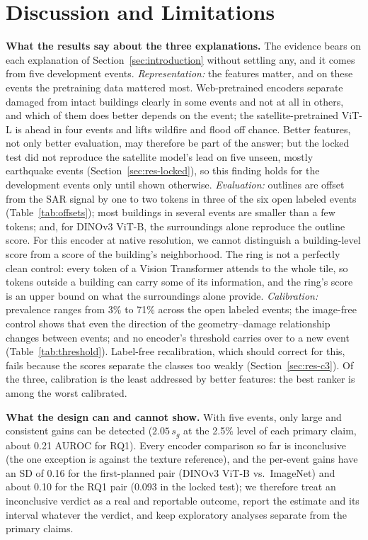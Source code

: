 \documentclass{ieeeaccess}
\begin{document}
\section{Discussion and Limitations}
\label{sec:discussion}

\textbf{What the results say about the three explanations.} The evidence bears on each explanation of Section~\ref{sec:introduction} without settling any, and it comes from five development events. \emph{Representation:} the features matter, and on these events the pretraining data mattered most. Web-pretrained encoders separate damaged from intact buildings clearly in some events and not at all in others, and which of them does better depends on the event; the satellite-pretrained ViT-L is ahead in four events and lifts wildfire and flood off chance. Better features, not only better evaluation, may therefore be part of the answer; but the locked test did not reproduce the satellite model's lead on five unseen, mostly earthquake events (Section~\ref{sec:res-locked}), so this finding holds for the development events only until shown otherwise. \emph{Evaluation:} outlines are offset from the SAR signal by one to two tokens in three of the six open labeled events (Table~\ref{tab:offsets}); most buildings in several events are smaller than a few tokens; and, for DINOv3 ViT-B, the surroundings alone reproduce the outline score. For this encoder at native resolution, we cannot distinguish a building-level score from a score of the building's neighborhood. The ring is not a perfectly clean control: every token of a Vision Transformer attends to the whole tile, so tokens outside a building can carry some of its information, and the ring's score is an upper bound on what the surroundings alone provide. \emph{Calibration:} prevalence ranges from 3\% to 71\% across the open labeled events; the image-free control shows that even the direction of the geometry--damage relationship changes between events; and no encoder's threshold carries over to a new event (Table~\ref{tab:threshold}). Label-free recalibration, which should correct for this, fails because the scores separate the classes too weakly (Section~\ref{sec:res-c3}). Of the three, calibration is the least addressed by better features: the best ranker is among the worst calibrated.

\textbf{What the design can and cannot show.} With five events, only large and consistent gains can be detected ($2.05\,s_g$ at the 2.5\% level of each primary claim, about 0.21 AUROC for RQ1). Every encoder comparison so far is inconclusive (the one exception is against the texture reference), and the per-event gains have an SD of 0.16 for the first-planned pair (DINOv3 ViT-B vs.\ ImageNet) and about 0.10 for the RQ1 pair (0.093 in the locked test); we therefore treat an inconclusive verdict as a real and reportable outcome, report the estimate and its interval whatever the verdict, and keep exploratory analyses separate from the primary claims.
\end{document}
